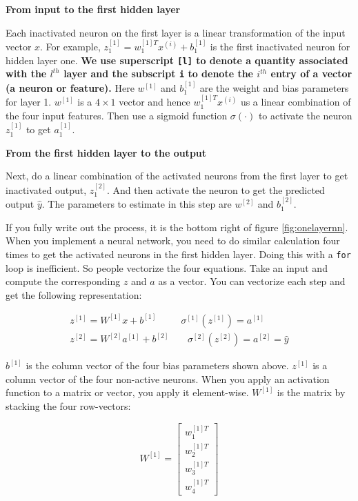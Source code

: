 \documentclass[12pt,]{krantz}
\begin{document}
\textbf{From input to the first hidden layer}

Each inactivated neuron on the first layer is a linear transformation of the input vector \(x\). For example, \(z^{[1]}_1 = w^{[1]T}_1x^{(i)} + b_1^{[1]}\) is the first inactivated neuron for hidden layer one. \textbf{We use superscript \texttt{{[}l{]}} to denote a quantity associated with the \(l^{th}\) layer and the subscript \texttt{i} to denote the \(i^{th}\) entry of a vector (a neuron or feature).} Here \(w^{[1]}\) and \(b_1^{[1]}\) are the weight and bias parameters for layer 1. \(w^{[1]}\) is a \(4 \times 1\) vector and hence \(w^{[1]T}_1x^{(i)}\) us a linear combination of the four input features. Then use a sigmoid function \(\sigma(\cdot)\) to activate the neuron \(z^{[1]}_1\) to get \(a^{[1]}_1\).

\textbf{From the first hidden layer to the output}

Next, do a linear combination of the activated neurons from the first layer to get inactivated output, \(z^{[2]}_1\). And then activate the neuron to get the predicted output \(\hat{y}\). The parameters to estimate in this step are \(w^{[2]}\) and \(b_1^{[2]}\).

If you fully write out the process, it is the bottom right of figure \ref{fig:onelayernn}. When you implement a neural network, you need to do similar calculation four times to get the activated neurons in the first hidden layer. Doing this with a \texttt{for} loop is inefficient. So people vectorize the four equations. Take an input and compute the corresponding \(z\) and \(a\) as a vector. You can vectorize each step and get the following representation:

\[\begin{array}{cc}
z^{[1]}=W^{[1]}x+b^{[1]} & \ \ \sigma^{[1]}(z^{[1]})=a^{[1]}\\
z^{[2]}=W^{[2]}a^{[1]}+b^{[2]} & \ \ \ \ \ \sigma^{[2]}(z^{[2]})=a^{[2]}=\hat{y}
\end{array}\]

\(b^{[1]}\) is the column vector of the four bias parameters shown above. \(z^{[1]}\) is a column vector of the four non-active neurons. When you apply an activation function to a matrix or vector, you apply it element-wise. \(W^{[1]}\) is the matrix by stacking the four row-vectors:

\[W^{[1]}=\left[\begin{array}{c}
w_{1}^{[1]T}\\
w_{2}^{[1]T}\\
w_{3}^{[1]T}\\
w_{4}^{[1]T}
\end{array}\right]\]
\end{document}

